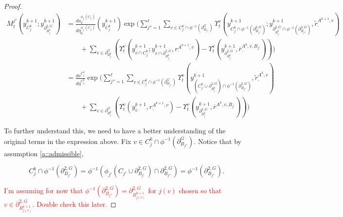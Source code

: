\documentclass[12pt]{article}
\newcommand{\ov}{\overline}
\newcommand{\tr}{\textcolor{red}}
\newcommand{\gneigh}[2]{\partial^{#1}_{#2}}			%
\newcommand{\dgneigh}[2]{\partial^{2,#1}_{#2}}		%
\newcommand{\cl}[1]{\ov{#1}}						%
\newcommand{\indx}[1]{^{#1}}						%
\newcommand{\rate}{r}								%
\newcommand{\xg}{y}									%
\newcommand{\vind}[1]{_{#1}}						%
\newcommand{\vpara}[1]{^{#1}}						%
\newcommand{\stpara}[1]{_{#1}}						%
\newcommand{\tpara}[1]{_{#1}}						%
\newcommand{\gvpara}[2]{^{#1,#2}}					%
\newcommand{\psize}{\ell}							%
\newcommand{\brate}{\alt{\rate}}					%
\newcommand{\alt}[1]{\tilde{#1}}					%
\newcommand{\mm}{\nu}								%
\newcommand{\bgrate}{\ov{\rate}}					%
\newcommand{\mmm}{\eta}								%
\newcommand{\ds}{\Upsilon}							%
\newcommand{\mdense}{M}								%
\newcommand{\gvjpara}[3]{^{#1,#2,#3}}				%
\newcommand{\jpara}[1]{^{#1}}						%
\begin{document}
\begin{proof}
\begin{align*}
\mdense\jpara{j'}\tpara{t}\left(\xg\indx{k+1}\vind{C_j\indx{k}};\xg\indx{k+1}\vind{\dgneigh{G}{B\indx{k}_j}}\right) &= \frac{d\mm\vpara{\phi_{j'}(C_{j'})}\tpara{0}}{d\mmm\vpara{\phi_{j'}(C_{j'})}\tpara{0}}(\xg\indx{k+1}\vind{C\indx{k}_j})\exp\Bigg(\sum_{j'' = 1}^{\psize}\sum_{v \in C_j\indx{k}\cap\phi^{-1}(\gneigh{G}{B_{j''}})} \ds\vpara{v}\tpara{t}\left(\xg\indx{k+1}\vind{C_j\indx{k}\cap\phi^{-1}(\dgneigh{G}{B_{j''}})};\xg\indx{k+1}\vind{\dgneigh{G}{B_j\indx{k}}\cap\phi^{-1}(\dgneigh{G}{B_{j''}})},\brate\gvpara{A\indx{k+1}}{v}\stpara{\cdot}\right)\\
&\hspace{24pt} + \sum_{v \in \gneigh{G}{B_j\indx{k}}} \left(\ds\vpara{v}\tpara{t}\left(\xg\indx{k+1}\vind{\cl{v}\cap C_j\indx{k}};\xg\indx{k+1}\vind{\cl{v}\cap\dgneigh{G}{B_j\indx{k}}},\rate\gvpara{A\indx{k+1}}{v}\stpara{\cdot}\right) - \ds\vpara{v}\tpara{t}\left(\xg\indx{k+1}\vind{\dgneigh{G}{B_j\indx{k}}},\bgrate\gvjpara{A\indx{k}}{v}{B_{j'}}\stpara{\cdot}\right)\right)\Bigg)\\
&= \frac{d\mm\vpara{C_j\indx{k}}}{d\mmm\vpara{C_j\indx{k}}}\exp\Bigg(\sum_{j'' =1}^{\psize}\sum_{v \in C_j\indx{k}\cap\phi^{-1}(\gneigh{G}{B_{j''}})} \ds\vpara{v}\tpara{t}\left(\xg\indx{k+1}\vind{\left(C_j\indx{k}\cup\dgneigh{G}{B_j\indx{k}}\right)\cap\phi^{-1}(\dgneigh{G}{B_{j''}})},\brate\gvpara{A\indx{k}}{v}\stpara{\cdot}\right)\\
&\hspace{24pt} + \sum_{v \in \gneigh{G}{B_j\indx{k}}}\left(\ds\vpara{v}\tpara{t}\left(\xg\indx{k+1}\vind{\cl{v}},\rate\gvpara{A\indx{k+1}}{v}\stpara{\cdot}\right) - \ds\vpara{v}\tpara{t}\left(\xg\indx{k+1}\vind{\dgneigh{G}{B_j\indx{k}}},\bgrate\gvjpara{A\indx{k}}{v}{B_{j'}}\right)\right)\Bigg)
\end{align*}

To further understand this, we need to have a better understanding of the original terms in the expression above. Fix \(v \in C_j\indx{k}\cap \phi^{-1}(\gneigh{G}{B_{j''}})\). Notice that by assumption \ref{a::admissible},

\[C_j\indx{k}\cap \phi^{-1}(\dgneigh{G}{B_{j''}}) = \phi^{-1}\left(\phi_{j'}\left(C_{j'}\cup\dgneigh{G}{B_{j'}}\right)\cap \dgneigh{G}{B_{j''}}\right) = \phi^{-1}\left(\dgneigh{G}{B_{j''}}\right).\]

\tr{I'm assuming for now that \(\phi^{-1}(\dgneigh{G}{B_{j''}}) = \dgneigh{G}{B_{j(v)}\indx{k+1}}\) for \(j(v)\) chosen so that \(v \in \dgneigh{G}{B_{j(v)}\indx{k+1}}\). Double check this later.}



\end{proof}
\end{document}
